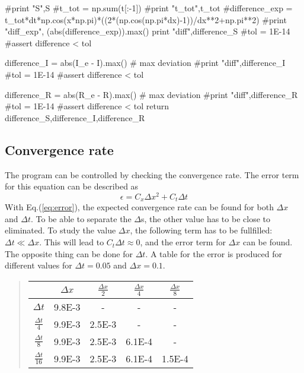 \documentclass[%
twoside,                 %
final,                   %
chapterprefix=true,      %
open=right               %
10pt]{book}
\begin{document}
    #print "S",S
    #t_tot = np.sum(t[:-1])
    #print "t_tot",t_tot
    #difference_exp = t_tot*dt*np.cos(x*np.pi)*((2*(np.cos(np.pi*dx)-1))/dx**2+np.pi**2)
    #print "diff_exp", (abs(difference_exp)).max()
    print "diff",difference_S
    #tol = 1E-14
    #assert difference < tol
    
    difference_I = abs(I_e - I).max()  # max deviation
    #print "diff",difference_I
    #tol = 1E-14
    #assert difference < tol
   
    difference_R = abs(R_e - R).max()  # max deviation
    #print "diff",difference_R
    #tol = 1E-14
    #assert difference < tol
    return difference_S,difference_I,difference_R
\epycod

\subsection{Convergence rate}
The program can be controlled by checking the convergence rate. The error term  for this equation can be described as  
\begin{equation} \label{eq:error}
    \epsilon = C_x\Delta x^2 + C_t \Delta t
\end{equation}
With Eq.(\ref{eq:error}), the expected convergence rate can be found for both $\Delta x$ and $\Delta t$. To be able to separate the $\Delta$s, the other value has to be close to eliminated. To study the value $\Delta x$, the following term has to be fullfilled: $\Delta t \ll \Delta x$. This will lead to $C_t\Delta t \approx 0$, and the error term for $\Delta x$ can be found. The opposite thing can  be done for $\Delta t$. A table for the error is produced for different values for $\Delta t = 0.05$ and $\Delta x=0.1$.

\label{table:error_numbers}

\begin{quote}
\begin{tabular}{ccccc}
\hline
\multicolumn{1}{c}{  } & \multicolumn{1}{c}{ $\Delta x$ } & \multicolumn{1}{c}{ $\frac{\Delta x}{2}$ } & \multicolumn{1}{c}{ $\frac{\Delta x}{4}$ } & \multicolumn{1}{c}{ $\frac{\Delta x}{8}$ } \\
\hline
$\Delta t     $       & 9.8E-3                & -                     & -                     & -                     \\
$\frac{\Delta t}{4} $ & 9.9E-3                & 2.5E-3                & -                     & -                     \\
$\frac{\Delta t}{8} $ & 9.9E-3                & 2.5E-3                & 6.1E-4                & -                     \\
$\frac{\Delta t}{16}$ & 9.9E-3                & 2.5E-3                & 6.1E-4                & 1.5E-4                \\
\hline
\end{tabular}
\end{quote}
\end{document}
